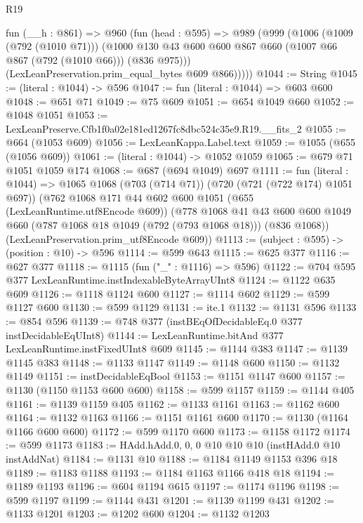 \begin{lexlean}{R19}
\begin{coremodule}
      fun (__h : @861) =>
      @960
        (fun (head : @595) =>
        @989
          (@999
            (@1006
              (@1009 (@792 (@1010 @71)))
              (@1000 @130 @43 @600 @600 @867 @660 (@1007 @66 @867 (@792 (@1010 @66))) (@836 @975)))
            (LexLeanPreservation.prim_equal_bytes @609 @866)))))
@1044 := String
@1045 := (literal : @1044) -> @596
@1047 := fun (literal : @1044) => @603 @600
@1048 := @651 @71
@1049 := @75 @609
@1051 := @654 @1049 @660
@1052 := @1048 @1051
@1053 := LexLeanPreserve.Cfb1f0a02e181ed1267fc8dbc524c35e9.R19.__fits_2
@1055 := @664 (@1053 @609)
@1056 := LexLeanKappa.Label.text
@1059 := @1055 (@655 (@1056 @609))
@1061 := (literal : @1044) -> @1052 @1059
@1065 := @679 @71 @1051 @1059 @174
@1068 := @687 (@694 @1049) @697
@1111 := fun (literal : @1044) =>
  @1065
    @1068
    (@703 (@714 @71))
    (@720 (@721 (@722 @174) @1051 @697))
    (@762
      @1068
      @171
      @44
      @602
      @600
      @1051
      (@655 (LexLeanRuntime.utf8Encode @609))
      (@778
        @1068
        @41
        @43
        @600
        @600
        @1049
        @660
        (@787 @1068 @18 @1049 (@792 (@793 @1068 @18)))
        (@836 @1068))
      (LexLeanPreservation.prim_utf8Encode @609))
@1113 := (subject : @595) -> (position : @10) -> @596
@1114 := @599 @643
@1115 := @625 @377
@1116 := @627 @377
@1118 := @1115 (fun ("_" : @1116) => @596)
@1122 := @704 @595 @377 LexLeanRuntime.instIndexableByteArrayUInt8
@1124 := @1122 @635 @609
@1126 := @1118 @1124 @600
@1127 := @1114 @602
@1129 := @599 @1127 @600
@1130 := @599 @1129
@1131 := ite.{1}
@1132 := @1131 @596
@1133 := @854 @596
@1139 := @748 @377 (instBEqOfDecidableEq.{0} @377 instDecidableEqUInt8)
@1144 := LexLeanRuntime.bitAnd @377 LexLeanRuntime.instFixedUInt8 @609
@1145 := @1144 @383
@1147 := @1139 @1145 @383
@1148 := @1133 @1147
@1149 := @1148 @600
@1150 := @1132 @1149
@1151 := instDecidableEqBool
@1153 := @1151 @1147 @600
@1157 := @1130 (@1150 @1153 @600 @600)
@1158 := @599 @1157
@1159 := @1144 @405
@1161 := @1139 @1159 @405
@1162 := @1133 @1161
@1163 := @1162 @600
@1164 := @1132 @1163
@1166 := @1151 @1161 @600
@1170 := @1130 (@1164 @1166 @600 @600)
@1172 := @599 @1170 @600
@1173 := @1158 @1172
@1174 := @599 @1173
@1183 := HAdd.hAdd.{0, 0, 0} @10 @10 @10 (instHAdd.{0} @10 instAddNat)
@1184 := @1131 @10
@1188 := @1184 @1149 @1153 @396 @18
@1189 := @1183 @1188
@1193 := @1184 @1163 @1166 @418 @18
@1194 := @1189 @1193
@1196 := @604 @1194 @615
@1197 := @1174 @1196
@1198 := @599 @1197
@1199 := @1144 @431
@1201 := @1139 @1199 @431
@1202 := @1133 @1201
@1203 := @1202 @600
@1204 := @1132 @1203

\end{coremodule}
\end{lexlean}
